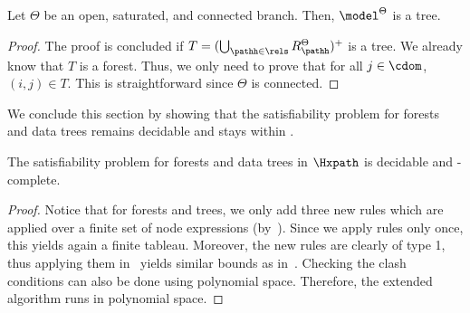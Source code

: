 \begin{prop}
    \label{prop:connectedtree}
    Let $\Theta$ be an open, saturated, and connected branch. Then, $\model^{\Theta}$ is a tree. 
\end{prop}

\begin{proof}
    The proof is concluded if $T = (\bigcup_{\pathh\in\rels} R_{\pathh}^{\Theta})^{+}$ is a tree.
    We already know that $T$ is a forest.
    Thus, we only need to prove that for all $j\in\cdom$, $(i,j)\in \mathbin{T}$.
    This is straightforward since $\Theta$ is connected.
\end{proof}

We conclude this section by showing that the satisfiability problem for forests and data trees remains decidable and stays within \pspace.

\begin{thm}
    \label{th:terminationtrees}
   The satisfiability problem for forests and data trees in $\Hxpath$ is decidable and \pspace-complete.
\end{thm}

\begin{proof}
    Notice that for forests and trees, we only add three new rules which are applied over
    a finite set of node expressions (by~). Since we apply rules only once, this yields again a finite tableau. Moreover, the new rules are clearly of type 1, thus applying them in~ yields similar bounds as in~. Checking the clash conditions can also be done using polynomial space. Therefore, the extended algorithm runs in polynomial space.
\end{proof}

